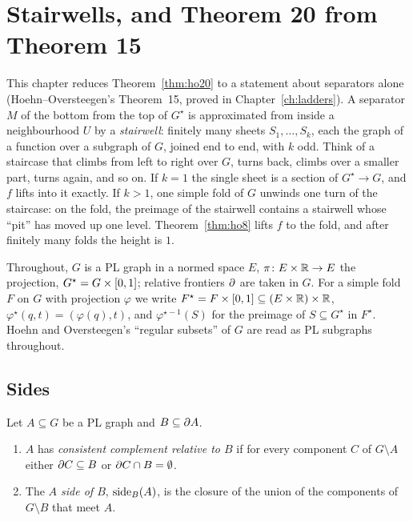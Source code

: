 \chapter{Stairwells, and Theorem 20 from Theorem 15}\label{ch:stairwells}

This chapter reduces Theorem~\ref{thm:ho20} to a statement about separators alone (Hoehn--Oversteegen's Theorem~15, proved in
Chapter~\ref{ch:ladders}). A separator $M$ of the bottom from the top of $G^\star$ is approximated from inside a neighbourhood $U$ by a
\emph{stairwell}: finitely many sheets $S_1,\dots,S_k$, each the graph of a function over a subgraph of $G$, joined end to end, with $k$ odd. Think of a
staircase that climbs from left to right over $G$, turns back, climbs over a smaller part, turns again, and so on. If $k=1$ the single sheet is a section
of $G^\star\to G$, and $f$ lifts into it exactly. If $k>1$, one simple fold of $G$ unwinds one turn of the staircase: on the fold, the preimage of the
stairwell contains a stairwell whose ``pit'' has moved up one level. Theorem~\ref{thm:ho8} lifts $f$ to the fold, and after finitely many folds the height
is $1$.

Throughout, $G$ is a PL graph in a normed space $E$, $\pi\colon E\times\mathbb{R}\to E$ the projection, $G^\star=G\times[0,1]$; relative frontiers $\partial$ are taken in $G$. For a simple fold
$F$ on $G$ with projection $\varphi$ we write $F^\star=F\times[0,1]\subseteq(E\times\mathbb{R})\times\mathbb{R}$, $\varphi^\star(q,t)=(\varphi(q),t)$, and $\varphi^{\star-1}(S)$ for the preimage of $S\subseteq G^\star$ in
$F^\star$. Hoehn and Oversteegen's ``regular subsets'' of $G$ are read as PL subgraphs throughout.

\section{Sides}

\begin{definition}\label{def:sides}
Let $A\subseteq G$ be a PL graph and $B\subseteq\partial A$.
\begin{enumerate}[label=(\alph*)]
\item $A$ has \emph{consistent complement relative to $B$} if for every component $C$ of $G\setminus A$ either $\partial C\subseteq B$ or $\partial C\cap B=\emptyset$.
\item The \emph{$A$ side of $B$}, $\operatorname{side}_B(A)$, is the closure of the union of the components of $G\setminus B$ that meet $A$.
\end{enumerate}
\end{definition}

